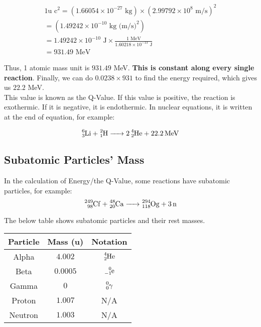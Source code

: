 \documentclass{article}
\begin{document}
\begin{multicols*}{2}
    \begin{equation*}
      \begin{split}
        1 \text{u c}^2 = (1.66054 \times 10^{-27} \text{ kg}) \times (2.99792 \times 10^{8} \text{ m/s})^2\\
        = (1.49242 \times 10^{-10} \text{ kg (m/s)}^2)\\
        = 1.49242 \times 10^{-10} \text{ J} \times
        \frac{1 \text{ MeV}}{1.60218 \times 10^{-13} \text{ J}}\\
        = 931.49 \text{ MeV}
      \end{split}
    \end{equation*}

    Thus, 1 atomic mass unit is $931.49$ MeV. \textbf{This is constant along
    every single reaction}. Finally, we can do $0.0238 \times 931$ to find the
    energy required, which gives us $22.2$ MeV.\\

    This value is known as the Q-Value. If this value is positive, the reaction
    is exothermic. If it is negative, it is endothermic. In nuclear equations,
    it is written at the end of equation, for example:

    \[
      \ce{^6_3Li + ^2_1H -> 2 ^4_2He + 22.2 MeV}
    \]

    \subsection{Subatomic Particles' Mass}
    In the calculation of Energy/the Q-Value, some reactions have subatomic particles,
    for example:
    \[
      \ce{^{249}_{98}Cf + ^{48}_{20}Ca -> ^{294}_{118}Og + 3 n}
    \]

    The below table shows subatomic particles and their rest masses.\\

    \begin{tabular}{|c|c|c|}
      \hline
      \textbf{Particle} & \textbf{Mass (u)} & \textbf{Notation} \\
      \hline
      Alpha   & $4.002$  & $\ce{^4_2He}$     \\
      Beta    & $0.0005$ & $\ce{^0_{-1}e}$   \\
      Gamma   & $0$      & $\ce{^0_0\gamma}$ \\
      \hline
      Proton  & $1.007$  & N/A \\
      Neutron & $1.003$  & N/A \\
      \hline
    \end{tabular}


\end{multicols*}
\end{document}
